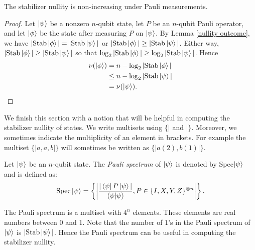 \documentclass[12pt]{dalthesis}
\begin{document}
\begin{corollary}
The stabilizer nullity is non-increasing under Pauli measurements.
\end{corollary}
\begin{proof}
Let $\ket{\psi}$ be a nonzero $n$-qubit state, let $P$ be an $n$-qubit Pauli operator, and let $\ket{\phi}$ be the state after measuring $P$ on $\ket{\psi}$. By Lemma \ref{nullity outcome}, we have $|\mathrm{Stab}\ket{\phi}| = |\mathrm{Stab}\ket{\psi}|$ or $|\mathrm{Stab}\ket{\phi}| \geq |\mathrm{Stab}\ket{\psi}|$. Either way, $|\mathrm{Stab}\ket{\phi}| \geq |\mathrm{Stab}\ket{\psi}|$ so that $\log_2|\mathrm{Stab}\ket{\phi}| \geq \log_2|\mathrm{Stab}\ket{\psi}|$. Hence 
\begin{equation*}
\begin{split}
\nu (\ket{\phi}) & = n - \log_2|\mathrm{Stab}\ket{\phi}| \\
& \leq n - \log_2|\mathrm{Stab}\ket{\psi}| \\
& = \nu(\ket{\psi}).
\end{split}
\end{equation*} \qedhere
\end{proof}

We finish this section with a notion that will be helpful in computing the stabilizer nullity of states. We write multisets using $\{|$ and $|\}$. Moreover, we sometimes indicate the multiplicity of an element in brackets. For example the multiset $\{| a, a, b |\}$ will sometimes be written as $\{| a (2), b (1) |\}$.

\begin{definition}
Let $\ket{\psi}$ be an $n$-qubit state. The \emph{Pauli spectrum} of $\ket{\psi}$ is denoted by Spec$\ket{\psi}$ and is defined as:
\begin{equation*}
\text{Spec}\ket{\psi} = \left\{ \bigg| \frac{|\bra{\psi}P\ket{\psi}|}{\braket{\psi|\psi}}, P \in \{I, X, Y, Z\}^{\otimes n} \bigg| \right\}.
\end{equation*}
\end{definition}

The Pauli spectrum is a multiset with $4^n$ elements. These elements are real numbers between 0 and 1. Note that the number of $1$'s in the Pauli spectrum of $\ket{\psi}$ is $|\text{Stab}\ket{\psi}|$. Hence the Pauli spectrum can be useful in computing the stabilizer nullity.
\end{document}
